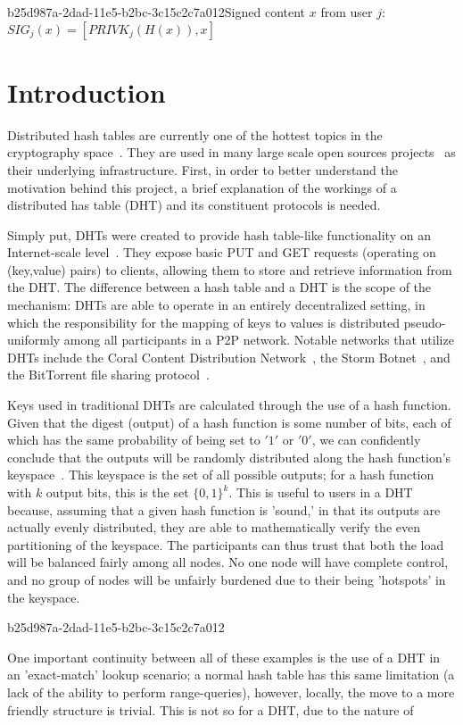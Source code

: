 \documentclass[12pt]{article}
\begin{document}
b25d987a-2dad-11e5-b2bc-3c15c2c7a012Signed content $x$ from user $j$: $SIG_j(x) = \left[ PRIVK_j( H(x) ), x \right]$

\section{Introduction}
\par Distributed hash tables are currently one of the hottest topics in the cryptography space~\cite{Stoica:2001dj,Rowstron:2001ea,Ratnasamy:2001wn}. They are used in many large scale open sources projects~\cite{Freitas:2013tb,Xu:2010vs,Perfitt:2010fh} as their underlying infrastructure. First, in order to better understand the motivation behind this project, a brief explanation of the workings of a distributed has table (DHT) and its constituent protocols is needed.

\par Simply put, DHTs were created to provide hash table-like functionality on an Internet-scale level~\cite{Ratnasamy:2001wn}. They expose basic PUT and GET requests (operating on (key,value) pairs) to clients, allowing them to store and retrieve information from the DHT. The difference between a hash table and a DHT is the scope of the mechanism: DHTs are able to operate in an entirely decentralized setting, in which the responsibility for the mapping of keys to values is distributed pseudo-uniformly among all participants in a P2P network. Notable networks that utilize DHTs include the Coral Content Distribution Network~\cite{Freedman:2004vb}, the Storm Botnet~\cite{Holz:2008uk}, and the BitTorrent file sharing protocol~\cite{Cohen:y1_8mBnw}.

\par Keys used in traditional DHTs are calculated through the use of a hash function. Given that the digest (output) of a hash function is some number of bits, each of which has the same probability of being set to $'1'$ or $'0'$, we can confidently conclude that the outputs will be randomly distributed along the hash function's keyspace~. This keyspace is the set of all possible outputs; for a hash function with $k$ output bits, this is the set $\{0,1\}^k$. This is useful to users in a DHT because, assuming that a given hash function is 'sound,' in that its outputs are actually evenly distributed, they are able to mathematically verify the even partitioning of the keyspace. The participants can thus trust that both the load will be balanced fairly among all nodes. No one node will have complete control, and no group of nodes will be unfairly burdened due to their being 'hotspots' in the keyspace.~

b25d987a-2dad-11e5-b2bc-3c15c2c7a012\par One important continuity between all of these examples is the use of a DHT in an 'exact-match' lookup scenario; a normal hash table has this same limitation (a lack of the ability to perform range-queries), however, locally, the move to a more friendly structure is trivial. This is not so for a DHT, due to the nature of
\printbibliography
\end{document}

